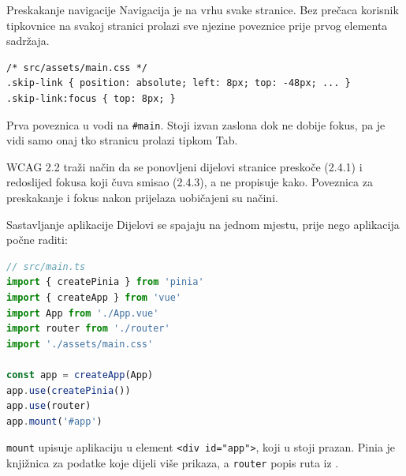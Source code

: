 \begin{frame}[fragile]{Preskakanje navigacije}
Navigacija je na vrhu svake stranice. Bez prečaca korisnik tipkovnice na svakoj stranici prolazi sve njezine poveznice prije prvog elementa sadržaja.

\begin{lstlisting}
/* src/assets/main.css */
.skip-link { position: absolute; left: 8px; top: -48px; ... }
.skip-link:focus { top: 8px; }
\end{lstlisting}

\vspace{0.2em}
Prva poveznica u  vodi na \texttt{\#main}. Stoji izvan zaslona dok ne dobije fokus, pa je vidi samo onaj tko stranicu prolazi tipkom Tab.

\vspace{0.4em}
\begin{konvencija}
WCAG 2.2 traži način da se ponovljeni dijelovi stranice preskoče (2.4.1) i redoslijed fokusa koji čuva smisao (2.4.3), a ne propisuje kako. Poveznica za preskakanje i fokus nakon prijelaza uobičajeni su načini.
\end{konvencija}
\end{frame}

\begin{frame}[fragile]{Sastavljanje aplikacije}
Dijelovi se spajaju na jednom mjestu, prije nego aplikacija počne raditi:

\begin{lstlisting}[language=typescript]
// src/main.ts
import { createPinia } from 'pinia'
import { createApp } from 'vue'
import App from './App.vue'
import router from './router'
import './assets/main.css'

const app = createApp(App)
app.use(createPinia())
app.use(router)
app.mount('#app')
\end{lstlisting}

\vspace{0.2em}
\texttt{mount} upisuje aplikaciju u element \texttt{<div id="app">}, koji u  stoji prazan. Pinia je knjižnica za podatke koje dijeli više prikaza, a \texttt{router} popis ruta iz .
\end{frame}

